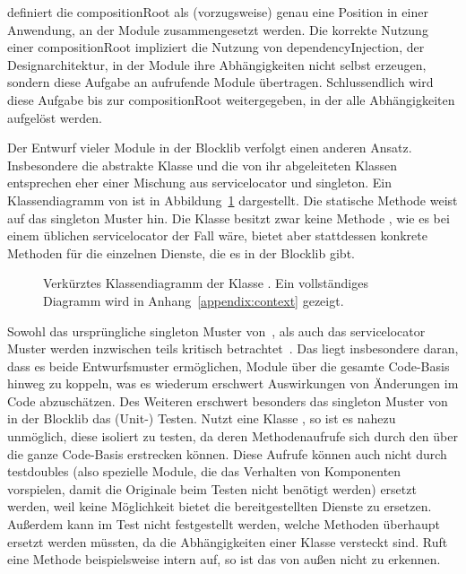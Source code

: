 \textcite[S.~76]{Seemann2012} definiert die \gls{compositionRoot} als (vorzugsweise) genau eine Position in einer Anwendung, an der Module zusammengesetzt werden. Die korrekte Nutzung einer \gls{compositionRoot} impliziert die Nutzung von \gls{dependencyInjection}, der Designarchitektur, in der Module ihre Abhängigkeiten nicht selbst erzeugen, sondern diese Aufgabe an aufrufende Module übertragen. Schlussendlich wird diese Aufgabe bis zur \gls{compositionRoot} weitergegeben, in der alle Abhängigkeiten aufgelöst werden. 


Der Entwurf vieler Module in der Blocklib verfolgt einen anderen Ansatz. Insbesondere die abstrakte Klasse  und die von ihr abgeleiteten Klassen entsprechen eher einer Mischung aus \gls{servicelocator} und \gls{singleton}. Ein Klassendiagramm von  ist in Abbildung~\ref{fig:diagContext} dargestellt. Die statische Methode  weist auf das \gls{singleton} Muster hin. Die Klasse besitzt zwar keine Methode , wie es bei einem üblichen \gls{servicelocator} der Fall wäre, bietet aber stattdessen konkrete Methoden für die einzelnen Dienste, die es in der Blocklib gibt.

\begin{figure}
  \begin{center}
    
  \end{center}
  \caption[Verkürztes Klassendiagramm der Klasse .]{Verkürztes Klassendiagramm der Klasse . Ein vollständiges Diagramm wird in Anhang~\vref{appendix:context} gezeigt.}\label{fig:diagContext}
\end{figure}

Sowohl das ursprüngliche \gls{singleton} Muster von~\textcite[S.~127~ff.]{Gamma2016}, als auch das \gls{servicelocator} Muster werden inzwischen teils kritisch betrachtet~\cite[S.~103~ff.]{Nystrom2015}\cite[S.~154~ff.]{Seemann2012}. Das liegt insbesondere daran, dass es beide Entwurfsmuster ermöglichen, Module über die gesamte Code-Basis hinweg zu koppeln, was es wiederum erschwert Auswirkungen von Änderungen im Code abzuschätzen. Des Weiteren erschwert besonders das \gls{singleton} Muster von  in der Blocklib das (Unit-) Testen. Nutzt eine Klasse , so ist es nahezu unmöglich, diese isoliert zu testen, da deren Methodenaufrufe sich durch den  über die ganze Code-Basis erstrecken können. Diese  Aufrufe können auch nicht durch \glspl{testdouble} (also spezielle Module, die das Verhalten von Komponenten vorspielen, damit die Originale beim Testen nicht benötigt werden) ersetzt werden, weil  keine Möglichkeit bietet die bereitgestellten Dienste zu ersetzen. Außerdem kann im Test nicht festgestellt werden, welche Methoden überhaupt ersetzt werden müssten, da die Abhängigkeiten einer Klasse versteckt sind. Ruft eine Methode beispielsweise intern  auf, so ist das von außen nicht zu erkennen.

